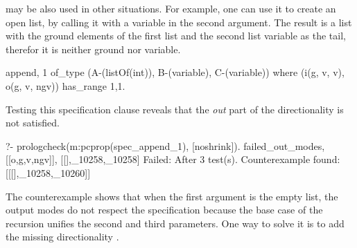 may be %
also
used in other situations.
%
For example, one can use it to create an open list, by %
calling it with a variable in the second argument.
%
The result is a list with the ground elements of the first list and the
second list variable as the tail, therefor it is neither ground nor
variable.
%
\begin{yapcode}
 {append, 1} of_type (A-(listOf(int)), B-(variable), C-(variable))
   where (i(g, v, v), o(g, v, ngv))  has_range {1,1}.
\end{yapcode}
%
Testing this specification clause reveals that the \emph{out} part of
the directionality is not satisfied.
\begin{yapcode}
  ?- prologcheck(m:pcprop(spec_append_1), [noshrink]).
 {failed_out_modes,[[o,g,v,ngv]], [[],_10258,_10258]}
 Failed: After 3 test(s).
 Counterexample found: [[[],_10258,_10260]] 
\end{yapcode}
%
The counterexample shows that when the first argument is the empty
list, %
the output modes do not respect %
the specification %
because
the base case of the recursion
unifies the second and third parameters.
%
One way to solve it 
is to add the missing directionality .
%



